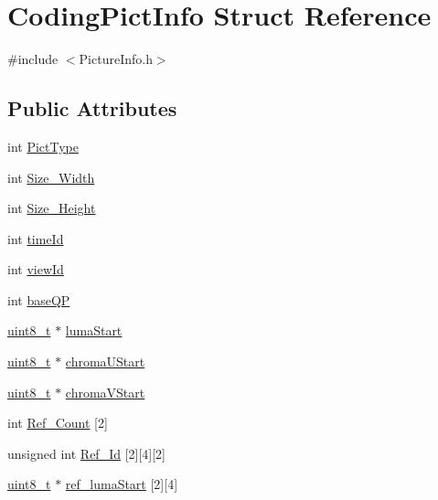 \hypertarget{struct_coding_pict_info}{
\section{CodingPictInfo Struct Reference}
\label{struct_coding_pict_info}
}


{\ttfamily \#include $<$PictureInfo.h$>$}

\subsection*{Public Attributes}
\begin{DoxyCompactItemize}
\item 
int \hyperlink{struct_coding_pict_info_a6bfb22b57d0d223546150c71e125fb39}{PictType}
\item 
int \hyperlink{struct_coding_pict_info_afeeb373571d44e64d473524e6127f3f7}{Size\_\-Width}
\item 
int \hyperlink{struct_coding_pict_info_aa6352dc53234c55d1a0c252c5b8d6141}{Size\_\-Height}
\item 
int \hyperlink{struct_coding_pict_info_ad85dae4751165ea3cbb8f7b8c6e61dc3}{timeId}
\item 
int \hyperlink{struct_coding_pict_info_a987595091bfba91b3166b04bca988697}{viewId}
\item 
int \hyperlink{struct_coding_pict_info_a6e808cdf552c3a18da4b75f4d0c35c28}{baseQP}
\item 
\hyperlink{_types_8h_a363e4d606232036a6b89060813c45489}{uint8\_\-t} $\ast$ \hyperlink{struct_coding_pict_info_a62aee8cc8c9cac725d4f44a19ddc8c2b}{lumaStart}
\item 
\hyperlink{_types_8h_a363e4d606232036a6b89060813c45489}{uint8\_\-t} $\ast$ \hyperlink{struct_coding_pict_info_a103a3180ba57db0bd984a53f0668b70b}{chromaUStart}
\item 
\hyperlink{_types_8h_a363e4d606232036a6b89060813c45489}{uint8\_\-t} $\ast$ \hyperlink{struct_coding_pict_info_a7be3395b2a1e7f4b384421c2490dcfdc}{chromaVStart}
\item 
int \hyperlink{struct_coding_pict_info_ab48541faa825385baeca833ffe98b3d4}{Ref\_\-Count} \mbox{[}2\mbox{]}
\item 
unsigned int \hyperlink{struct_coding_pict_info_a37079a7e9c26b338a6978063f471a82f}{Ref\_\-Id} \mbox{[}2\mbox{]}\mbox{[}4\mbox{]}\mbox{[}2\mbox{]}
\item 
\hyperlink{_types_8h_a363e4d606232036a6b89060813c45489}{uint8\_\-t} $\ast$ \hyperlink{struct_coding_pict_info_a8c8c3eeff0744de167b9ea6c5a7938a0}{ref\_\-lumaStart} \mbox{[}2\mbox{]}\mbox{[}4\mbox{]}

\end{DoxyCompactItemize}
